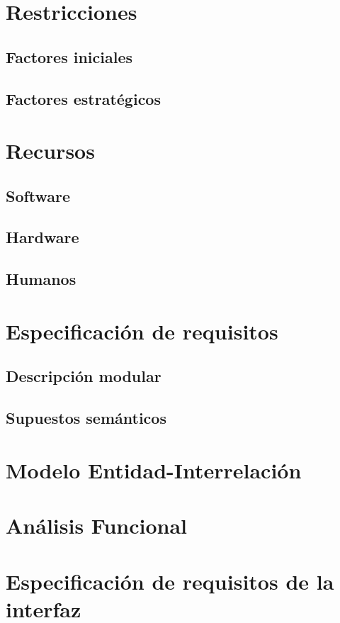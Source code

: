 \documentclass[a4paper,10pt,draft]{article}
\begin{document}
   \section{Restricciones}
      \subsection{Factores iniciales}
      \subsection{Factores estratégicos}

   \section{Recursos}
      \subsection{Software}
      \subsection{Hardware}
      \subsection{Humanos}

   \section{Especificación de requisitos}
      \subsection{Descripción modular}
      \subsection{Supuestos semánticos}

   \section{Modelo Entidad-Interrelación}

   \section{Análisis Funcional}

   \section{Especificación de requisitos de la interfaz}
\end{document}
